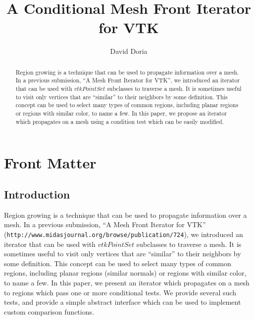 \documentclass{InsightArticle}
\title{A Conditional Mesh Front Iterator for VTK}
\author{David Doria}
\newcommand{\IJhandlerIDnumber}{3162}
\begin{document}
%
% 
\IJhandlefooter{\IJhandlerIDnumber}


\ifpdf
\else
\fi


\maketitle

\ifhtml
\chapter*{Front Matter\label{front}}
\fi

\begin{abstract}
\noindent
Region growing is a technique that can be used to propagate information over a mesh. In a previous submission, ``A Mesh Front Iterator for VTK'', we introduced an iterator that can be used with $vtkPointSet$ subclasses to traverse a mesh. It is sometimes useful to visit only vertices that are ``similar'' to their neighbors by some definition. This concept can be used to select many types of common regions, including planar regions or regions with similar color, to name a few. In this paper, we propose an iterator which propagates on a mesh using a condition test which can be easily modified.
\end{abstract}

\IJhandlenote{\IJhandlerIDnumber}

\tableofcontents

\section{Introduction}
Region growing is a technique that can be used to propagate information over a mesh. In a previous submission, ``A Mesh Front Iterator for VTK'' (\verb|http://www.midasjournal.org/browse/publication/724|), we introduced an iterator that can be used with $vtkPointSet$ subclasses to traverse a mesh. It is sometimes useful to visit only vertices that are ``similar'' to their neighbors by some definition. This concept can be used to select many types of common regions, including planar regions (similar normals) or regions with similar color, to name a few. In this paper, we present an iterator which propagates on a mesh to regions which pass one or more conditional tests. We provide several such tests, and provide a simple abstract interface which can be used to implement custom comparison functions.
\end{document}
